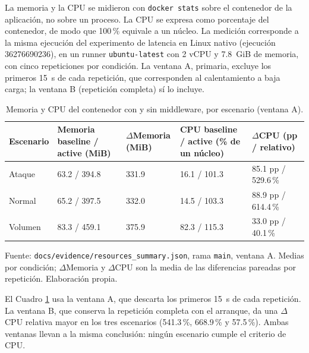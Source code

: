 La memoria y la CPU se midieron con \texttt{docker stats} sobre el contenedor de la aplicación, no sobre un proceso. La CPU se expresa como porcentaje del contenedor, de modo que 100\,\% equivale a un núcleo. La medición corresponde a la misma ejecución del experimento de latencia en Linux nativo (ejecución 36276690236), en un runner \texttt{ubuntu-latest} con 2 vCPU y 7.8~GiB de memoria, con cinco repeticiones por condición. La ventana A, primaria, excluye los primeros 15~s de cada repetición, que corresponden al calentamiento a baja carga; la ventana B (repetición completa) sí lo incluye.

\begin{table}[htbp]
\centering
\footnotesize
\setlength{\tabcolsep}{3pt}
\begin{tabular}{|p{3.0cm}|p{2.6cm}|p{2.6cm}|p{2.6cm}|p{2.6cm}|}
\hline
\textbf{Escenario} & \textbf{Memoria baseline / active (MiB)} & \textbf{$\Delta$Memoria (MiB)} & \textbf{CPU baseline / active (\% de un núcleo)} & \textbf{$\Delta$CPU (pp / relativo)} \\ \hline
Ataque & 63.2 / 394.8 & 331.9 & 16.1 / 101.3 & 85.1 pp / 529.6\,\% \\ \hline
Normal & 65.2 / 397.5 & 332.0 & 14.5 / 103.3 & 88.9 pp / 614.4\,\% \\ \hline
Volumen & 83.3 / 459.1 & 375.9 & 82.3 / 115.3 & 33.0 pp / 40.1\,\% \\ \hline
\end{tabular}
\caption{Memoria y CPU del contenedor con y sin middleware, por escenario (ventana A).}
\label{tabla:res-recursos}
\par\smallskip\footnotesize Fuente: \texttt{docs/evidence/resources\_summary.json}, rama \texttt{main}, ventana A. Medias por condición; $\Delta$Memoria y $\Delta$CPU son la media de las diferencias pareadas por repetición. Elaboración propia.
\end{table}

El Cuadro \ref{tabla:res-recursos} usa la ventana A, que descarta los primeros 15~s de cada repetición. La ventana B, que conserva la repetición completa con el arranque, da una $\Delta$CPU relativa mayor en los tres escenarios (541.3\,\%, 668.9\,\% y 57.5\,\%). Ambas ventanas llevan a la misma conclusión: ningún escenario cumple el criterio de CPU.

